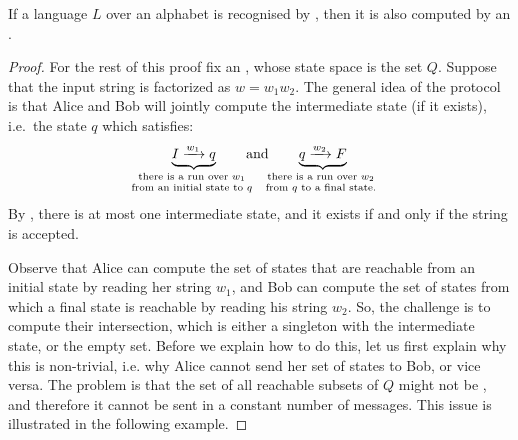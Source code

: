 \begin{theorem}
    \label{thm:unambiguous-to-protocol}
    If a language $L$ over an  alphabet is recognised by 
    , then 
    it is also computed by an .
\end{theorem}
\begin{proof}
  For the rest of this proof fix an , whose state space is the  set $Q$.
Suppose that the input string is factorized as $w = w_1 w_2$. The general idea of the protocol is that Alice and Bob will jointly
compute the intermediate state (if it exists), i.e.~the state $q$ which satisfies:
\begin{align*}
\myunderbrace{I \xrightarrow{w_1}q}{there is a run over $w_1$\\ from an initial state to $q$} \qquad \text{and} \qquad
\myunderbrace{q \xrightarrow{w_2} F}{there is a run over $w_2$\\ from $q$ to a final state.}
\end{align*}
By , there is at most one intermediate state, and it exists if and only if the string is accepted.

Observe that Alice can compute the set of states that are reachable from an
initial state by reading her string $w_1$, and Bob can compute the set of
states from which a final state is reachable by reading his string $w_2$. So,
the challenge is to compute their intersection, which is either a singleton
with the intermediate state, or the empty set. Before we explain how to do
this, let us first explain why this is non-trivial, i.e. why Alice cannot send
her set of states to Bob, or vice versa. The problem is that the set of all
reachable subsets of $Q$ might not be , and therefore it cannot be sent
in a constant number of messages. This issue is illustrated in the following
example.


\end{proof}
